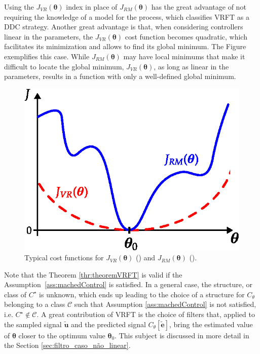 Using the $J_{VR}(\bm{\theta})$ index in place of $J_{RM}(\bm{\theta})$ has the great advantage of not requiring the knowledge of a model for the process, which classifies VRFT as a DDC strategy. Another great advantage is that, when considering controllers linear in the parameters, the $J_{VR}(\bm{\theta})$ cost function becomes quadratic, which facilitates its minimization and allows to find its global minimum. The Figure  exemplifies this case. While $J_{RM}(\bm{\theta})$ may have local minimums that make it difficult to locate the global minimum, $J_{VR}(\bm{\theta})$, as long as linear in the parameters, results in a function with only a well-defined global minimum.
\begin{figure}[htpb]
    
   \centering
   \includegraphics{Figs/JVR_JRM_plot.eps}
   \caption{Typical cost functions for $J_{VR}(\bm{\theta})$ () and $J_{RM}(\bm{\theta})$ ().}
   \label{fig:JVR_JRM_plot}
\end{figure}

Note that the Theorem \ref{thr:theoremVRFT} is valid if the Assumption~\ref{ass:machedControl} is satisfied. In a general case, the structure, or class of $C^\star$ is unknown, which ends up leading to the choice of a structure for $C_\theta$ belonging to a class $\mathscr{C}$ such that Assumption \ref{ass:machedControl} is not satisfied, i.e. $C^\star \notin \mathscr{C} $.
A great contribution of VRFT is the choice of filters that, applied to the sampled signal $\tilde{\bm{u}}$ and the predicted signal $C_\theta[\tilde{\bm{e}}]$, bring the estimated value of $\bm{\theta}$ closer to the optimum value $\bm{\theta}_0$. This subject is discussed in more detail in the Section \ref{sec:filtro_caso_não_linear}.

